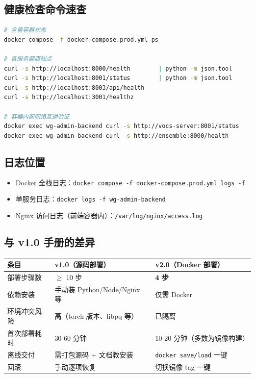 \documentclass[UTF8,a4paper,11pt]{ctexart}
\begin{document}
\subsection{健康检查命令速查}

\begin{lstlisting}[language=bash]
# 全量容器状态
docker compose -f docker-compose.prod.yml ps

# 各服务健康端点
curl -s http://localhost:8000/health        | python -m json.tool
curl -s http://localhost:8001/status        | python -m json.tool
curl -s http://localhost:8003/api/health
curl -s http://localhost:3001/healthz

# 容器内部网络互通验证
docker exec wg-admin-backend curl -s http://vocs-server:8001/status
docker exec wg-admin-backend curl -s http://ensemble:8000/health
\end{lstlisting}

\subsection{日志位置}

\begin{itemize}[leftmargin=1.4em,itemsep=2pt]
  \item Docker 全栈日志：\texttt{docker compose -f docker-compose.prod.yml logs -f}
  \item 单服务日志：\texttt{docker logs -f wg-admin-backend}
  \item Nginx 访问日志（前端容器内）：\texttt{/var/log/nginx/access.log}
\end{itemize}

\subsection{与 v1.0 手册的差异}

\begin{longtable}{L{4.5cm} L{4.5cm} L{4.5cm}}
\toprule
\textbf{条目} & \textbf{v1.0（源码部署）} & \textbf{v2.0（Docker 部署）} \\
\midrule
\endhead
部署步骤数      & $\geq$ 10 步         & \textbf{4 步} \\
依赖安装        & 手动装 Python/Node/Nginx 等 & 仅需 Docker \\
环境冲突风险    & 高（torch 版本、libpq 等） & 已隔离 \\
首次部署耗时    & 30-60 分钟            & 10-20 分钟（多数为镜像构建） \\
离线交付        & 需打包源码 + 文档教安装  & \texttt{docker save/load} 一键 \\
回滚            & 手动逐项恢复          & 切换镜像 tag 一键 \\
\bottomrule
\end{longtable}
\end{document}
